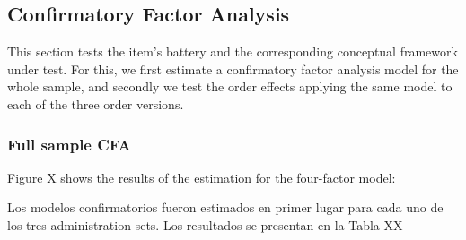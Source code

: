 \documentclass[
]{article}
\begin{document}
\hypertarget{confirmatory-factor-analysis}{%
\subsection{Confirmatory Factor
Analysis}\label{confirmatory-factor-analysis}}

This section tests the item's battery and the corresponding conceptual
framework under test. For this, we first estimate a confirmatory factor
analysis model for the whole sample, and secondly we test the order
effects applying the same model to each of the three order versions.

\hypertarget{full-sample-cfa}{%
\subsubsection{Full sample CFA}\label{full-sample-cfa}}

Figure X shows the results of the estimation for the four-factor model:

Los modelos confirmatorios fueron estimados en primer lugar para cada
uno de los tres administration-sets. Los resultados se presentan en la
Tabla XX
\end{document}
